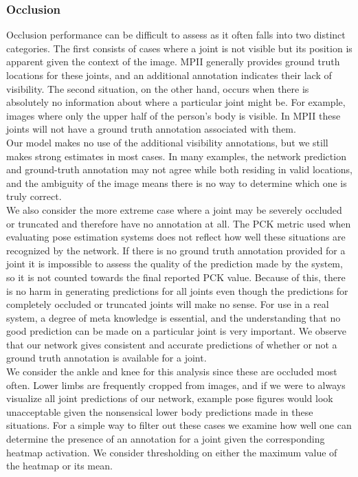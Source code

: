 \documentclass[final]{cvpr}
\begin{document}
\subsubsection{Occlusion}
Occlusion performance can be difficult to assess as it often falls into two distinct categories. The first consists of cases where a joint is not visible but its position is apparent given the context of the image. MPII generally provides ground truth locations for these joints, and an additional annotation indicates their lack of visibility. The second situation, on the other hand, occurs when there is absolutely no information about where a particular joint might be. For example,
images where only the upper half of the person’s body is visible. In MPII these joints will not have a ground truth annotation associated with them.\\
\indent Our model makes no use of the additional visibility annotations, but we still makes strong estimates in most cases. In many examples, the network prediction and ground-truth annotation may not agree while both residing in valid locations, and the ambiguity of the image means there is no way to determine which one is truly correct. \\
\indent We also consider the more extreme case where a joint may be severely occluded or truncated and therefore have no annotation at all. The PCK metric used when evaluating pose estimation systems does not reflect how well these situations are recognized by the network. If there is no ground truth annotation provided for a joint it is impossible to assess the quality of the prediction made by the system, so it is not counted towards the final reported PCK value. Because of this, there is no harm in generating predictions for all joints even though the predictions for completely occluded or truncated joints will make no sense. For use in a real system, a degree of meta knowledge is essential, and the understanding that no good prediction can be made on a particular joint is very important. We observe that our network gives consistent and accurate predictions of whether or not a ground truth annotation is available for a joint. \\
\indent We consider the ankle and knee for this analysis since these are occluded most often. Lower limbs are frequently cropped from images, and if we were to always visualize all joint predictions of our network, example pose figures would look unacceptable given the nonsensical lower body predictions made in these situations. For a simple way to filter out these cases we examine how well one can determine the presence of an annotation for a joint given the corresponding heatmap activation. We consider thresholding on either the maximum value of the heatmap or its mean.
\end{document}
